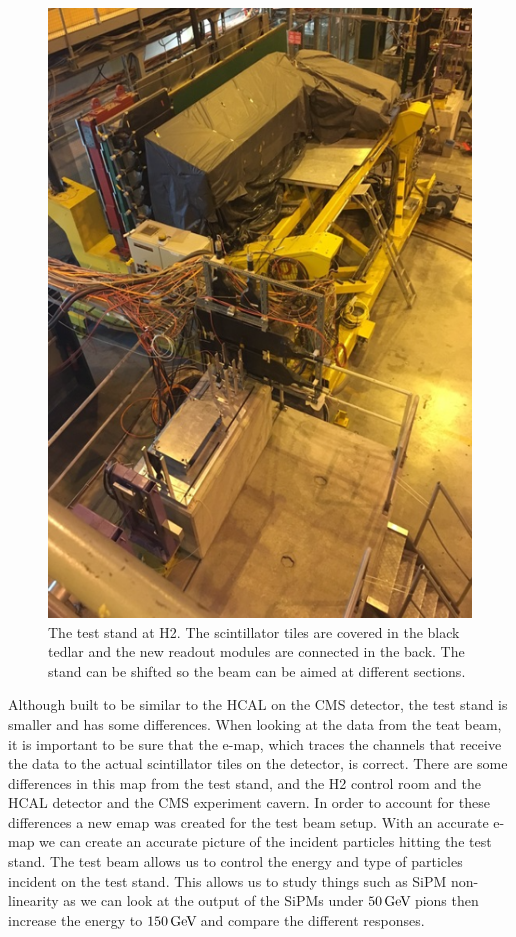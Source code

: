 \begin{figure}
\centering
\includegraphics[width=0.6\linewidth]{Figures/Teststand.png}
\caption{The test stand at H2. The scintillator tiles are covered in the black tedlar and the new readout modules are connected in the back. The stand can be shifted so the beam can be aimed at different sections.}
\label{fig:stand}
\end{figure}

Although built to be similar to the HCAL on the CMS detector, the test stand is smaller and has some differences. When looking at the data from the teat beam, it is important to be sure that the e-map, which traces the channels that receive the data to the actual scintillator tiles on the detector, is correct. There are some differences in this map from the test stand, and the H2 control room and the HCAL detector and the CMS experiment cavern. In order to account for these differences a new emap was created for the test beam setup. With an accurate e-map we can create an accurate picture of the incident particles hitting the test stand. The test beam allows us to control the energy and type of particles incident on the test stand. This allows us to study things such as SiPM non-linearity as we can look at the output of the SiPMs under $50 {\,\text{Ge\hspace{-.08em}V\hspace{-0.16em}}}$ pions then increase the energy to $150 {\,\text{Ge\hspace{-.08em}V\hspace{-0.16em}}}$ and compare the different responses. 

